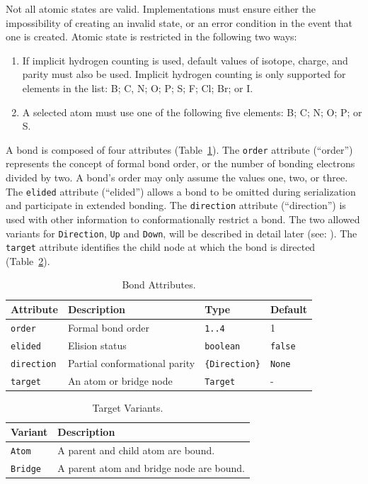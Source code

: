 \documentclass{article}
\def\ttt{\texttt}
\begin{document}
Not all atomic states are valid. Implementations must ensure either the impossibility of creating an invalid state, or an error condition in the event that one is created. Atomic state is restricted in the following two ways:

\begin{enumerate}
    \item{If implicit hydrogen counting is used, default values of isotope, charge, and parity must also be used. Implicit hydrogen counting is only supported for elements in the list: B; C, N; O; P; S; F; Cl; Br; or I.}
    \item{A selected atom must use one of the following five elements: B; C; N; O; P; or S.}
\end{enumerate}

A bond is composed of four attributes (Table~\ref{table:bond-attributes}). The \ttt{order} attribute (\enquote{order}) represents the concept of formal bond order, or the number of bonding electrons divided by two. A bond's order may only assume the values one, two, or three. The \ttt{elided} attribute (\enquote{elided}) allows a bond to be omitted during serialization and participate in extended bonding. The \ttt{direction} attribute (\enquote{direction}) is used with other information to conformationally restrict a bond. The two allowed variants for \ttt{Direction}, \ttt{Up} and \ttt{Down}, will be described in detail later (see: ). The \ttt{target} attribute identifies the child node at which the bond is directed (Table~\ref{table:target-variants}).

\begin{table}
\caption{Bond Attributes.}
\centering
\begin{tabular}{l p{3.6cm} l l}
    \hline
    Attribute & Description & Type & Default \\
    \hline
    \ttt{order} & Formal bond order & \ttt{1..4} & 1 \\
    \ttt{elided} & Elision status & \ttt{boolean} & \ttt{false} \\
    \ttt{direction} & Partial conformational parity & \ttt{\{Direction\}} & \ttt{None} \\
    \ttt{target} & An atom or bridge node & \ttt{Target} & - \\
    \hline
\end{tabular}
\label{table:bond-attributes}
\end{table}

\begin{table}
\caption{Target Variants.}
\centering
\begin{tabular}{l p{6.6cm}}
    \hline
    Variant & Description \\
    \hline
    \ttt{Atom} & A parent and child atom are bound. \\
    \tt{Bridge} & A parent atom and bridge node are bound. \\
    \hline
\end{tabular}
\label{table:target-variants}
\end{table}
\end{document}

